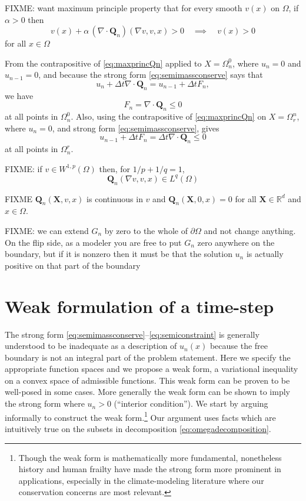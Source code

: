 \documentclass[final,leqno,onefignum,onetabnum]{siamltex1213bueler}
\newcommand\bQ{\mathbf{Q}}
\newcommand\bX{\mathbf{X}}
\newcommand{\Div}{\nabla\cdot}
\renewcommand{\grad}{\nabla}
\newcommand\RR{\mathbb{R}}
\begin{document}
FIXME:  want maximum principle property that for every smooth $v(x)$ on $\Omega$, if $\alpha>0$ then
\begin{equation}
v(x) + \alpha\, (\Div \bQ_n)(\grad v,v,x) > 0 \quad \implies \quad v(x) > 0 \label{eq:maxprincQn}
\end{equation}
for all $x\in\Omega$ 

From the contrapositive of \eqref{eq:maxprincQn} applied to $X = \Omega_n^0$, where $u_n=0$ and $u_{n-1}=0$, and because the strong form \eqref{eq:semimassconserve} says that
   $$u_n + \Delta t \Div \bQ_n = u_{n-1} + \Delta t F_n,$$
we have
\begin{equation}
F_n = \Div \bQ_n \le 0  \label{eq:divfluxnonpositive}
\end{equation}
at all points in $\Omega_n^0$.  Also, using the contrapositive of \eqref{eq:maxprincQn} on $X = \Omega_r^n$, where $u_n=0$, and strong form \eqref{eq:semimassconserve}, gives
\begin{equation}
u_{n-1} + \Delta t F_n = \Delta t \Div\bQ_n \le 0  \label{eq:inequalityonretreat}
\end{equation}
at all points in $\Omega_n^r$.

FIXME: if $v \in W^{1,p}(\Omega)$ then, for $1/p + 1/q = 1$,
\begin{equation}
\bQ_n(\grad v,v,x) \in L^q(\Omega) \label{eq:QisLq}
\end{equation}
 

FIXME $\bQ_n(\bX,v,x)$ is continuous in $v$ and $\bQ_n(\bX,0,x)=0$ for all $\bX\in\RR^d$ and $x\in\Omega$.

FIXME: we can extend $G_n$ by zero to the whole of $\partial \Omega$ and not change anything.  On the flip side, as a modeler you are free to put $G_n$ zero anywhere on the boundary, but if it is nonzero then it must be that the solution $u_n$ is actually positive on that part of the boundary


\section{Weak formulation of a time-step}  \label{sec:weakform}

The strong form \eqref{eq:semimassconserve}--\eqref{eq:semiconstraint} is generally understood to be inadequate as a description of $u_n(x)$ because the free boundary is not an integral part of the problem statement.  Here we specify the appropriate function spaces and we propose a weak form, a variational inequality \cite{Friedman,KinderlehrerStampacchia} on a convex space of admissible functions.  This weak form can be proven to be well-posed in some cases.  More generally the weak form can be shown to imply the strong form where $u_n>0$ (``interior condition'').  We start by arguing informally to construct the weak form.\footnote{Though the weak form is mathematically more fundamental, nonetheless history and human frailty have made the strong form more prominent in applications, especially in the climate-modeling literature where our conservation concerns are most relevant.}  Our argument uses facts which are intuitively true on the subsets in decomposition \eqref{eq:omegadecomposition}.
\end{document}

